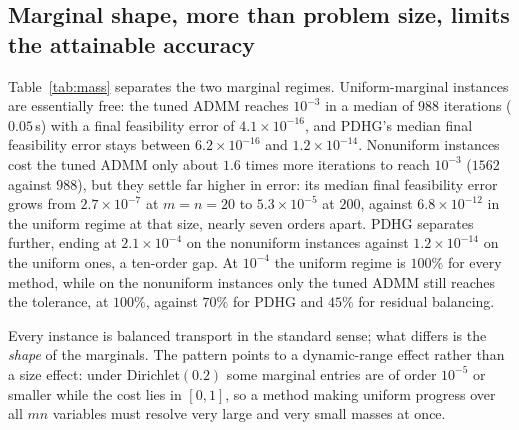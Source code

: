 \documentclass{article}
\newcommand{\eFeas}{e_{\mathrm{feas}}}
\newcommand{\Tol}[1]{10^{-#1}}
\begin{document}
\begin{table}[t]
\centering
\caption{Solve rate and median time in seconds to reach a tolerance, over $10$
instances per size (two marginal regimes, five seeds). A run counts as solved only
when both errors are below the tolerance; the time is the median over the runs that
reached it.}
\label{tab:main}
\small

\end{table}

\subsection{Marginal shape, more than problem size, limits the attainable accuracy}
\label{sec:mass}

Table~\ref{tab:mass} separates the two marginal regimes. Uniform-marginal instances are
essentially free: the tuned ADMM reaches $\Tol{3}$ in a median of $988$ iterations
($0.05$\,s) with a final feasibility error of $4.1\times\Tol{16}$, and PDHG's median final
feasibility error stays between $6.2\times\Tol{16}$ and $1.2\times\Tol{14}$. Nonuniform
instances cost the tuned ADMM only about $1.6$ times more iterations to reach $\Tol{3}$
($1562$ against $988$), but they settle far higher in error: its median final feasibility
error grows from $2.7\times\Tol{7}$ at $m=n=20$ to $5.3\times\Tol{5}$ at $200$, against
$6.8\times\Tol{12}$ in the uniform regime at that size, nearly seven orders apart. PDHG
separates further, ending at $2.1\times\Tol{4}$ on the nonuniform instances against
$1.2\times\Tol{14}$ on the uniform ones, a ten-order gap. At $\Tol{4}$ the uniform regime
is $100\%$ for every method, while on the nonuniform instances only the tuned ADMM still
reaches the tolerance, at $100\%$, against $70\%$ for PDHG and $45\%$ for residual
balancing.

Every instance is balanced transport in the standard sense; what differs is the \emph{shape}
of the marginals. The pattern points to a dynamic-range effect rather than a size effect:
under Dirichlet$(0.2)$ some marginal entries are of order $\Tol{5}$ or smaller while the cost
lies in $[0,1]$, so a method making uniform progress over all $mn$ variables must resolve
very large and very small masses at once.

\begin{table}[t]
\centering
\caption{Effect of the marginal regime over all four sizes and five seeds. ``rate
(time)'' is the solve rate at $\Tol{3}$ and the median time of the solved runs;
``iters'' and $\eFeas$ are medians over all $20$ runs of the regime, including
those that did not reach the tolerance.}
\label{tab:mass}
\small

\end{table}
\end{document}
